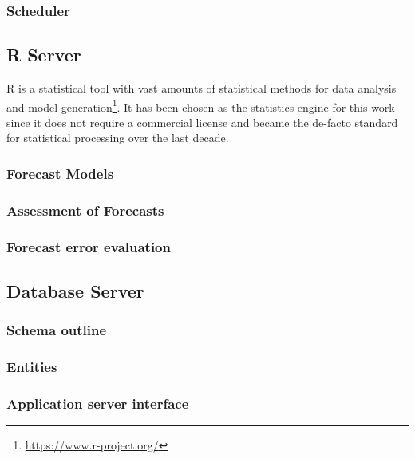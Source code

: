 \subsubsection{Scheduler}


\subsection{R Server}

R is a statistical tool with vast amounts of statistical methods for data analysis and model generation\footnote{\url{https://www.r-project.org/}}. It has been chosen as the statistics engine for this work since it does not require a commercial license and became the de-facto standard for statistical processing over the last decade. 

\subsubsection{Forecast Models}

\subsubsection{Assessment of Forecasts}

\subsubsection{Forecast error evaluation}


\subsection{Database Server}

\subsubsection{Schema outline}

\subsubsection{Entities}

\subsubsection{Application server interface}




 
